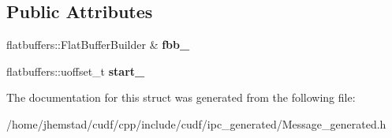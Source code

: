 \subsection*{Public Attributes}
\begin{DoxyCompactItemize}
\item 
flatbuffers\+::\+Flat\+Buffer\+Builder \& {\bfseries fbb\+\_\+}\hypertarget{structorg_1_1apache_1_1arrow_1_1flatbuf_1_1DictionaryBatchBuilder_a52b232f33868d636fc3be5d503973df9}{}\label{structorg_1_1apache_1_1arrow_1_1flatbuf_1_1DictionaryBatchBuilder_a52b232f33868d636fc3be5d503973df9}

\item 
flatbuffers\+::uoffset\+\_\+t {\bfseries start\+\_\+}\hypertarget{structorg_1_1apache_1_1arrow_1_1flatbuf_1_1DictionaryBatchBuilder_a7e96c30251dbec85090a56089237b83c}{}\label{structorg_1_1apache_1_1arrow_1_1flatbuf_1_1DictionaryBatchBuilder_a7e96c30251dbec85090a56089237b83c}

\end{DoxyCompactItemize}


The documentation for this struct was generated from the following file\+:\begin{DoxyCompactItemize}
\item 
/home/jhemstad/cudf/cpp/include/cudf/ipc\+\_\+generated/Message\+\_\+generated.\+h\end{DoxyCompactItemize}
